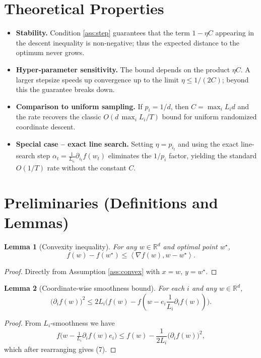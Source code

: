 \documentclass{article}
\newtheorem{lemma}{Lemma}
\newcommand{\ip}[2]{\left\langle #1,#2\right\rangle}
\begin{document}
\section*{Theoretical Properties}
\begin{itemize}
\item \textbf{Stability.} Condition \eqref{ass:step} guarantees that the term $1-\eta C$ appearing in the descent inequality is non‑negative; thus the expected distance to the optimum never grows.
\item \textbf{Hyper‑parameter sensitivity.} The bound depends on the product $\eta C$. A larger stepsize speeds up convergence up to the limit $\eta\le 1/(2C)$; beyond this the guarantee breaks down.
\item \textbf{Comparison to uniform sampling.} If $p_i=1/d$, then $C=\max_i L_i d$ and the rate recovers the classic $O(d\,\max_i L_i/T)$ bound for uniform randomized coordinate descent.
\item \textbf{Special case – exact line search.} Setting $\eta = p_{i_t}$ and using the exact line‐search step $\alpha_t = \frac{1}{L_{i_t}}\partial_{i_t}f(w_t)$ eliminates the $1/p_i$ factor, yielding the standard $O(1/T)$ rate without the constant $C$.
\end{itemize}

\section*{Preliminaries (Definitions and Lemmas)}
\begin{lemma}[Convexity inequality]\label{lem:conv}
For any $w\in\mathbb{R}^d$ and optimal point $w^\star$,
\[
f(w)-f(w^\star)\le \ip{\nabla f(w)}{w-w^\star}.
\tag{6}
\]
\end{lemma}
\begin{proof}
Directly from Assumption \ref{ass:convex} with $x=w$, $y=w^\star$.
\end{proof}

\begin{lemma}[Coordinate‑wise smoothness bound]\label{lem:smooth}
For each $i$ and any $w\in\mathbb{R}^d$,
\[
\bigl(\partial_i f(w)\bigr)^2\le 2L_i\bigl(f(w)-f(w-e_i\frac{1}{L_i}\partial_i f(w))\bigr).
\tag{7}
\]
\end{lemma}
\begin{proof}
From $L_i$‑smoothness we have
\[
f\!\bigl(w-\tfrac{1}{L_i}\partial_i f(w)e_i\bigr)
\le f(w)-\frac{1}{2L_i}\bigl(\partial_i f(w)\bigr)^2,
\]
which after rearranging gives (7).
\end{proof}
\end{document}

